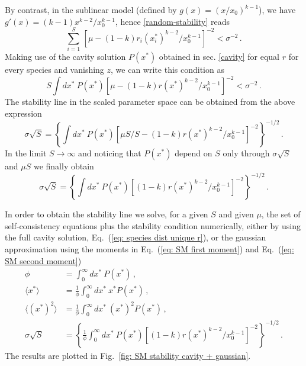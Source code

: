 \documentclass[10pt]{article}
\begin{document}
By contrast, in the sublinear model (defined by $g(x) = (x/x_0)^{k-1}$), we have $g'(x) = (k-1) x^{k-2}/x_0^{k-1}$, hence \eqref{random-stability} reads
\begin{equation}
    \sum_{i=1}^S\, [\mu - (1-k) r_i (x_i^*)^{k-2}/x_0^{k-1}]^{-2}< \sigma^{-2} \, .
\end{equation} 
Making use of the cavity solution $P(x^*)$ obtained in sec. \ref{cavity}
for equal $r$ for every species and vanishing $z$,
we can write this condition as 
\begin{equation}
    S \int dx^* \ P( x^*)[\mu - (1-k) r (x^*)^{k-2}/x_0^{k-1}]^{-2}< \sigma^{-2} \, .
\end{equation}
The stability line in the scaled parameter space 
can be obtained from the above expression
\begin{equation}
    \sigma\sqrt{S} = \left\{\int dx^* \ P( x^*)[\mu S / S - (1-k) r (x^*)^{k-2}/x_0^{k-1}]^{-2}\right\}^{-1/2} \, .
\end{equation}
In the limit $S\to \infty$ and noticing that $P(x^*)$ depend
on $S$ only through $\sigma\sqrt{S}$ and $\mu S$ we finally obtain
\begin{equation}
    \sigma\sqrt{S} = \left\{\int dx^* \ P( x^*)[(1-k) r (x^*)^{k-2}/x_0^{k-1}]^{-2}\right\}^{-1/2} \, .
\end{equation}

In order to obtain the stability line we solve, 
for a given $S$ and given $\mu$,
the set of self-consistency equations plus the stability condition
numerically, either by using the full cavity solution, Eq.~(\ref{eq: species dist unique r}), or the gaussian approximation using the moments
in Eq.~(\ref{eq: SM first moment}) and Eq.~(\ref{eq: SM second moment})
\begin{align}
    \phi&= \int_0^{\infty}dx^* \ P(x^*)\, , \nonumber \\
    \langle x^*\rangle&=\frac{1}{\phi}\int_0^{\infty}dx^* \ x^*P(x^*) \, , \label{eq: self-consistenty}\\
    \langle (x^*)^2\rangle&=\frac{1}{\phi}\int_0^{\infty}dx^* \ (x^*)^2 P(x^*) \, , \nonumber \\
    \sigma\sqrt{S} &= \left\{\frac{1}{\phi}\int_0^{\infty} dx^* \ P( x^*)[(1-k) r (x^*)^{k-2}/x_0^{k-1}]^{-2}\right\}^{-1/2} \, . \nonumber
\end{align}
The results are plotted in Fig.~\ref{fig: SM stability cavity + gaussian}.
\end{document}
